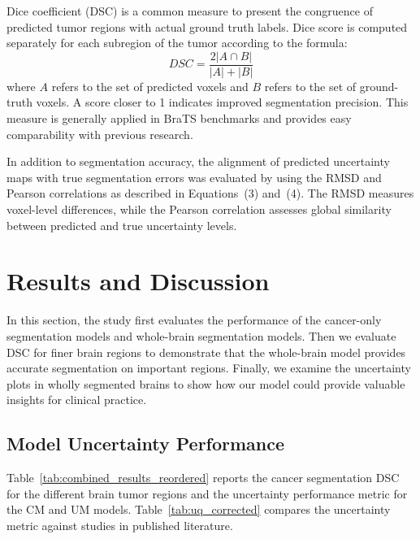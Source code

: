 \documentclass[11pt,letterpaper]{article}
\begin{document}
Dice coefficient (DSC) is a common measure to present the congruence of predicted tumor regions with actual ground truth labels. Dice score is computed separately for each subregion of the tumor according to the formula:
\begin{equation}
DSC = \frac{2|A \cap B|}{|A| + |B|}
\end{equation}
where $A$ refers to the set of predicted voxels and $B$ refers to the set of ground-truth voxels. A score closer to 1 indicates improved segmentation precision. This measure is generally applied in BraTS benchmarks and provides easy comparability with previous research.

In addition to segmentation accuracy, the alignment of predicted uncertainty maps with true segmentation errors was evaluated by using the RMSD and Pearson correlations as described in Equations~(3) and~(4). The RMSD measures voxel-level differences, while the Pearson correlation assesses global similarity between predicted and true uncertainty levels.

\section{Results and Discussion}
In this section, the study first evaluates the performance of the cancer-only segmentation models and whole-brain segmentation models. Then we evaluate DSC for finer brain regions to demonstrate that the whole-brain model provides accurate segmentation on important regions. Finally, we examine the uncertainty plots in wholly segmented brains to show how our model could provide valuable insights for clinical practice.

\subsection{Model Uncertainty Performance}
Table~\ref{tab:combined_results_reordered} reports the cancer segmentation DSC for the different brain tumor regions and the uncertainty performance metric for the CM and UM models. Table~\ref{tab:uq_corrected} compares the uncertainty metric against studies in published literature.
\end{document}
